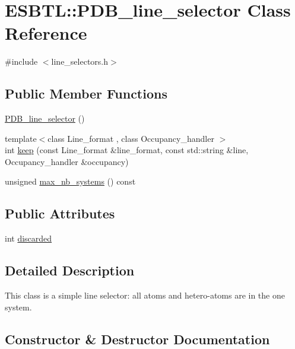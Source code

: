 \hypertarget{classESBTL_1_1PDB__line__selector}{}\section{E\+S\+B\+TL\+:\+:P\+D\+B\+\_\+line\+\_\+selector Class Reference}
\label{classESBTL_1_1PDB__line__selector}


{\ttfamily \#include $<$line\+\_\+selectors.\+h$>$}

\subsection*{Public Member Functions}
\begin{DoxyCompactItemize}
\item 
\hyperlink{classESBTL_1_1PDB__line__selector_a0e6b7ac307ae30263f621a26a90216ed}{P\+D\+B\+\_\+line\+\_\+selector} ()
\item 
{\footnotesize template$<$class Line\+\_\+format , class Occupancy\+\_\+handler $>$ }\\int \hyperlink{classESBTL_1_1PDB__line__selector_af1c6dbbc4ee800042d585d6024671752}{keep} (const Line\+\_\+format \&line\+\_\+format, const std\+::string \&line, Occupancy\+\_\+handler \&occupancy)
\item 
unsigned \hyperlink{classESBTL_1_1PDB__line__selector_acce91d190ab3c2f9361374aa42c7ffca}{max\+\_\+nb\+\_\+systems} () const
\end{DoxyCompactItemize}
\subsection*{Public Attributes}
\begin{DoxyCompactItemize}
\item 
int \hyperlink{classESBTL_1_1PDB__line__selector_a8cd3267b5c5acf2c4ce708cd1fae5499}{discarded}
\end{DoxyCompactItemize}


\subsection{Detailed Description}
This class is a simple line selector\+: all atoms and hetero-\/atoms are in the one system. 

\subsection{Constructor \& Destructor Documentation}
\mbox{\label{classESBTL_1_1PDB__line__selector_a0e6b7ac307ae30263f621a26a90216ed}} 
